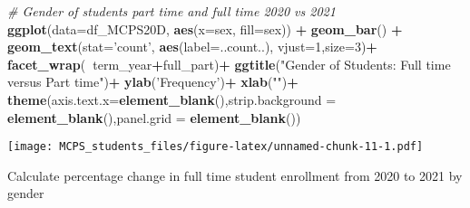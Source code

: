 \documentclass[]{article}
\newenvironment{Shaded}{\begin{snugshade}}{\end{snugshade}}
\newcommand{\CommentTok}[1]{\textcolor[rgb]{0.56,0.35,0.01}{\textit{#1}}}
\newcommand{\DataTypeTok}[1]{\textcolor[rgb]{0.13,0.29,0.53}{#1}}
\newcommand{\DecValTok}[1]{\textcolor[rgb]{0.00,0.00,0.81}{#1}}
\newcommand{\KeywordTok}[1]{\textcolor[rgb]{0.13,0.29,0.53}{\textbf{#1}}}
\newcommand{\NormalTok}[1]{#1}
\newcommand{\OperatorTok}[1]{\textcolor[rgb]{0.81,0.36,0.00}{\textbf{#1}}}
\newcommand{\OtherTok}[1]{\textcolor[rgb]{0.56,0.35,0.01}{#1}}
\newcommand{\StringTok}[1]{\textcolor[rgb]{0.31,0.60,0.02}{#1}}
\begin{document}
\begin{Shaded}
\begin{Highlighting}[]
\CommentTok{# Gender of students part time and full time  2020 vs 2021}
\KeywordTok{ggplot}\NormalTok{(}\DataTypeTok{data=}\NormalTok{df_MCPS20D, }\KeywordTok{aes}\NormalTok{(}\DataTypeTok{x=}\NormalTok{sex, }\DataTypeTok{fill=}\NormalTok{sex)) }\OperatorTok{+}
\StringTok{      }\KeywordTok{geom_bar}\NormalTok{() }\OperatorTok{+}
\StringTok{      }\KeywordTok{geom_text}\NormalTok{(}\DataTypeTok{stat=}\StringTok{'count'}\NormalTok{, }\KeywordTok{aes}\NormalTok{(}\DataTypeTok{label=}\NormalTok{..count..), }\DataTypeTok{vjust=}\DecValTok{1}\NormalTok{,}\DataTypeTok{size=}\DecValTok{3}\NormalTok{)}\OperatorTok{+}
\StringTok{      }\KeywordTok{facet_wrap}\NormalTok{(}\OperatorTok{~}\NormalTok{term_year}\OperatorTok{+}\NormalTok{full_part)}\OperatorTok{+}
\StringTok{      }\KeywordTok{ggtitle}\NormalTok{(}\StringTok{"Gender of Students: Full time versus Part time"}\NormalTok{)}\OperatorTok{+}
\StringTok{      }\KeywordTok{ylab}\NormalTok{(}\StringTok{'Frequency'}\NormalTok{)}\OperatorTok{+}
\StringTok{      }\KeywordTok{xlab}\NormalTok{(}\StringTok{""}\NormalTok{)}\OperatorTok{+}
\StringTok{      }\KeywordTok{theme}\NormalTok{(}\DataTypeTok{axis.text.x=}\KeywordTok{element_blank}\NormalTok{(),}\DataTypeTok{strip.background =} \KeywordTok{element_blank}\NormalTok{(),}\DataTypeTok{panel.grid =} \KeywordTok{element_blank}\NormalTok{())}
\end{Highlighting}
\end{Shaded}

\texttt{[image: MCPS\_students\_files/figure-latex/unnamed-chunk-11-1.pdf]}

Calculate percentage change in full time student enrollment from 2020 to
2021 by gender

\begin{Shaded}
\end{Shaded}
\end{document}
